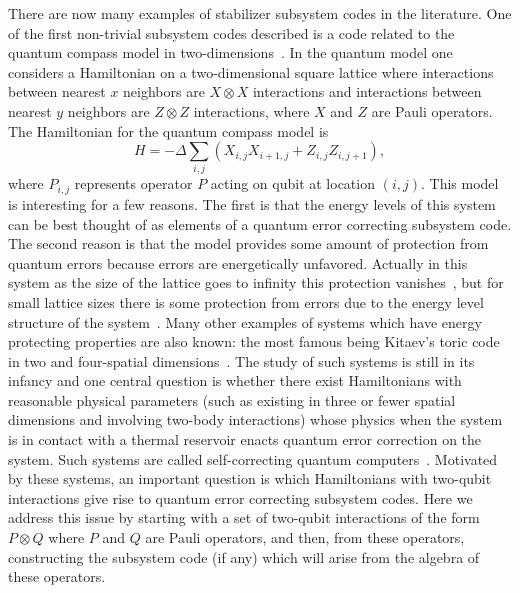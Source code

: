 \documentclass[twocolumn,showpacs,preprintnumbers,amsmath,amssymb,nofootinbib,pra,floatfix]{revtex4-1}
\begin{document}
There are now many examples of stabilizer subsystem codes in the literature.  One of the first non-trivial subsystem codes described is a code related to the quantum compass model in two-dimensions~\cite{Bacon:01a,Dorier:05a,Bacon:06a}.  In the quantum model one considers a Hamiltonian on a two-dimensional square lattice where interactions between nearest $x$ neighbors are $X \otimes X$ interactions and interactions between nearest $y$ neighbors are $Z \otimes Z$ interactions, where $X$ and $Z$ are Pauli operators.  The Hamiltonian for the quantum compass model is
\begin{equation}
H=-\Delta \sum_{i,j} (X_{i,j} X_{i+1,j} +Z_{i,j} Z_{i,j+1}),
\end{equation}
where $P_{i,j}$ represents operator $P$ acting on qubit at location $(i,j)$.  This model is interesting for a few reasons.  The first is that the energy levels of this system can be best thought of as elements of a quantum error correcting subsystem code.  The second reason is that the model provides some amount of protection from quantum errors because errors are energetically unfavored.  Actually in this system as the size of the lattice goes to infinity this protection vanishes~\cite{Dorier:05a}, but for small lattice sizes there is some protection from errors due to the energy level structure of the system~\cite{Bacon:01a}.  Many other examples of systems which have energy protecting properties are also known: the most famous being Kitaev's toric code in two and four-spatial dimensions~\cite{Kitaev:97c,Kitaev:03a,Dennis:02a}.  The study of such systems is still in its infancy and one central question is whether there exist Hamiltonians with reasonable physical parameters (such as existing in three or fewer spatial dimensions and involving two-body interactions) whose physics when the system is in contact with a thermal reservoir enacts quantum error correction on the system.  Such systems are called self-correcting quantum computers~\cite{Bacon:06a,Bombin:09a}.  Motivated by these systems, an important question is which Hamiltonians with two-qubit interactions give rise to quantum error correcting subsystem codes.  Here we address this issue by starting with a set of two-qubit interactions of the form $P\otimes Q$ where $P$ and $Q$ are Pauli operators, and then, from these operators, constructing the subsystem code (if any) which will arise from the algebra of these operators.
\end{document}
